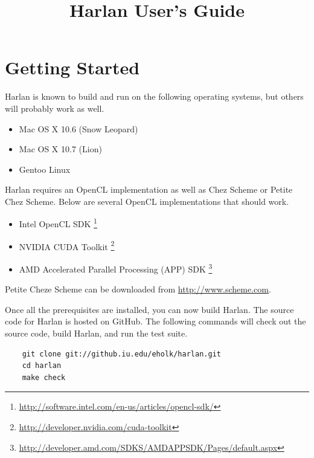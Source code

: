 \documentclass[oneside]{report}
\begin{document}

\title{Harlan User's Guide}

\maketitle

\tableofcontents

\chapter{Getting Started}

Harlan is known to build and run on the following operating systems,
but others will probably work as well.

\begin{itemize}
\item Mac OS X 10.6 (Snow Leopard)
\item Mac OS X 10.7 (Lion)
\item Gentoo Linux
\end{itemize}

Harlan requires an OpenCL implementation as well as Chez Scheme or
Petite Chez Scheme. Below are several OpenCL implementations that
should work.

\begin{itemize}
\item Intel OpenCL SDK
  \footnote{\url{http://software.intel.com/en-us/articles/opencl-sdk/}}
\item NVIDIA CUDA Toolkit
  \footnote{\url{http://developer.nvidia.com/cuda-toolkit}}
\item AMD Accelerated Parallel Processing (APP) SDK
  \footnote{\url{http://developer.amd.com/SDKS/AMDAPPSDK/Pages/default.aspx}}
\end{itemize}

Petite Cheze Scheme can be downloaded from
\url{http://www.scheme.com}.

Once all the prerequisites are installed, you can now build
Harlan. The source code for Harlan is hosted on GitHub. The following
commands will check out the source code, build Harlan, and run the
test suite.

\begin{verbatim}
    git clone git://github.iu.edu/eholk/harlan.git
    cd harlan
    make check
\end{verbatim}
\end{document}
